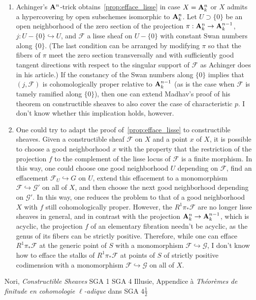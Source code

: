 \documentclass[deligne.tex]{subfiles}
\begin{document}
\begin{remark}\begin{enumerate}
	\item Achinger's $\mathbf{A}^n$-trick obtains~\eqref{prop:efface_lisse} in case
	$X=\mathbf{A}^n_k$ or $X$ admits a hypercovering by open subschemes 	isomorphic to $\mathbf{A}^n_k$. Let $U\supset \{0\}$ be an open neighborhood of
	the zero section of the projection $\pi:\mathbf{A}^n_k\rightarrow\mathbf{A}^{n-1}_k$,
	$j:U-\{0\}\hookrightarrow U$, and $\mathcal F$ a lisse sheaf on $U-\{0\}$
	with constant Swan numbers along $\{0\}$. (The last condition can be 
	arranged by modifying $\pi$ so that the fibers of $\pi$ meet the zero
	section transversally and with sufficiently good tangent directions
	with respect to the singular support of $\mathcal F$ as Achinger does in
	his article.) If the constancy of the Swan numbers along $\{0\}$ implies
	that $(j,\mathcal F)$ is cohomologically proper relative to $\mathbf{A}^{n-1}_k$
	(as is the case when $\mathcal F$ is tamely ramified along $\{0\}$), then
	one can extend Madhav's proof of his theorem on constructible sheaves to
	also cover the case of characteristic $p$. I don't know whether this
	implication holds, however.
	\item One could try to adapt the proof of~\eqref{prop:efface_lisse} to 
	constructible sheaves.
	Given a constructible sheaf $\mathcal F$ on $X$ and a point $x$ of $X$,
	it is possible to choose a good neighborhood $x$ with the property that
	the restriction of the projection $f$ to the complement of the lisse
	locus of $\mathcal F$ is a finite morphism. In this way, one could choose
	one good neighborhood $U$ depending on $\mathcal F$, find an effacement
	$\mathcal F_U\hookrightarrow G$ on $U$, extend this effacement to a
	monomorphism $\mathcal F\hookrightarrow\mathcal G'$ on all of $X$, and
	then choose the next good neighborhood depending on $\mathcal G'$.
	In this way, one reduces the problem to that of a good neighborhood $X$ 
	with $f$ still cohomologically proper.
	However, the $R^1\pi_*\mathcal F$ are no longer lisse sheaves in general,
	and in contrast with the projection $\mathbf{A}^n_k\rightarrow\mathbf{A}^{n-1}_k$, which is
	acyclic, the projection $f$ of an elementary fibration needn't be 
	acyclic, as the genus of its fibers can be strictly positive.
	Therefore, while one can efface $R^1\pi_*\mathcal F$ at the generic point
	of $S$ with a monomorphism $\mathcal F\hookrightarrow\mathcal G$, I don't
	know how to efface the stalks of $R^1\pi_*\mathcal F$ at points of $S$ of
	strictly positive codimension with a monomorphism
	$\mathcal F\hookrightarrow\mathcal G$ on all of $X$.
\end{enumerate}
\end{remark}






\begin{thebibliography}{Illusie}
 Nori, \emph{Constructible Sheaves}
 SGA 1
 SGA 4
 Illusie, Appendice à \textit{Théorèmes de finitude en cohomologie $\ell$-adique} dans SGA $4\frac12$


\end{thebibliography}
\end{document}
